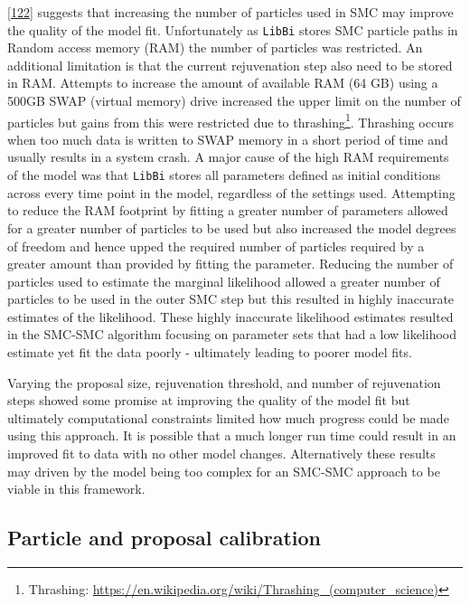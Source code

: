 \documentclass[11pt,twoside]{bristolthesis}
\begin{document}
  {[}\protect\hyperlink{ref-Murray2015}{122}{]} suggests that increasing the number of particles used in SMC may improve the quality of the model fit. Unfortunately as \texttt{LibBi} stores SMC particle paths in Random access memory (RAM) the number of particles was restricted. An additional limitation is that the current rejuvenation step also need to be stored in RAM. Attempts to increase the amount of available RAM (64 GB) using a 500GB SWAP (virtual memory) drive increased the upper limit on the number of particles but gains from this were restricted due to thrashing\footnote{Thrashing: \url{https://en.wikipedia.org/wiki/Thrashing_(computer_science)}}. Thrashing occurs when too much data is written to SWAP memory in a short period of time and usually results in a system crash. A major cause of the high RAM requirements of the model was that \texttt{LibBi} stores all parameters defined as initial conditions across every time point in the model, regardless of the settings used. Attempting to reduce the RAM footprint by fitting a greater number of parameters allowed for a greater number of particles to be used but also increased the model degrees of freedom and hence upped the required number of particles required by a greater amount than provided by fitting the parameter. Reducing the number of particles used to estimate the marginal likelihood allowed a greater number of particles to be used in the outer SMC step but this resulted in highly inaccurate estimates of the likelihood. These highly inaccurate likelihood estimates resulted in the SMC-SMC algorithm focusing on parameter sets that had a low likelihood estimate yet fit the data poorly - ultimately leading to poorer model fits.
  
  Varying the proposal size, rejuvenation threshold, and number of rejuvenation steps showed some promise at improving the quality of the model fit but ultimately computational constraints limited how much progress could be made using this approach. It is possible that a much longer run time could result in an improved fit to data with no other model changes. Alternatively these results may driven by the model being too complex for an SMC-SMC approach to be viable in this framework.
  
  \hypertarget{particle-and-proposal-calibration}{%
  \subsection{Particle and proposal calibration}\label{particle-and-proposal-calibration}}
  
\end{document}
